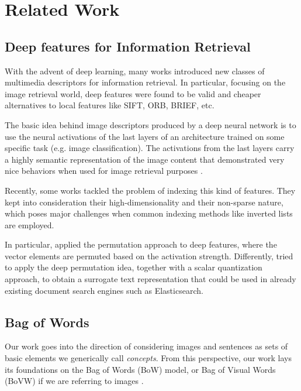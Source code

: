 \documentclass[conference]{IEEEtran}
\begin{document}

\section{Related Work}
\subsection*{Deep features for Information Retrieval}
With the advent of deep learning, many works introduced new classes of multimedia descriptors for information retrieval. In particular, focusing on the image retrieval world, deep features were found to be valid and cheaper alternatives to local features like SIFT, ORB, BRIEF, etc.

The basic idea behind image descriptors produced by a deep neural network is to use the neural activations of the last layers of an architecture trained on some specific task (e.g. image classification). The activations from the last layers carry a highly semantic representation of the image content that demonstrated very nice behaviors when used for image retrieval purposes \cite{tolias2016rmac,donahue2014decaf,razavian2014cnnfeatures}.

Recently, some works \cite{amato2016deeppermutations,amato2019large,jain2017subic,liu2018cnnindexing} tackled the problem of indexing this kind of features. They kept into consideration their high-dimensionality and their non-sparse nature, which poses major challenges when common indexing methods like inverted lists are employed.

In particular, \cite{amato2016deeppermutations} applied the permutation approach \cite{amato2014mifile} to deep features, where the vector elements are permuted based on the activation strength. 
Differently, \cite{amato2019large} tried to apply the deep permutation idea, together with a scalar quantization approach, to obtain a surrogate text representation that could be used in already existing document search engines such as Elasticsearch.

\subsection*{Bag of Words}
Our work goes into the direction of considering images and sentences as sets of basic elements we generically call \textit{concepts}.
From this perspective, our work lays its foundations on the Bag of Words (BoW) model, or Bag of Visual Words (BoVW) if we are referring to images \cite{sivic2003bow,Jegou2010bagoffeatures}. 
\end{document}
